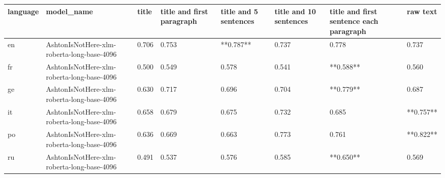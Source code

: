 \begin{tabular}{llllllll}
\toprule
language &                                 model\_name & title & title and first paragraph & title and 5 sentences & title and 10 sentences & title and first sentence each paragraph &  raw text \\
\midrule
      en & AshtonIsNotHere-xlm-roberta-long-base-4096 & 0.706 &                     0.753 &             **0.787** &                  0.737 &                                   0.778 &     0.737 \\
      fr & AshtonIsNotHere-xlm-roberta-long-base-4096 & 0.500 &                     0.549 &                 0.578 &                  0.541 &                               **0.588** &     0.560 \\
      ge & AshtonIsNotHere-xlm-roberta-long-base-4096 & 0.630 &                     0.717 &                 0.696 &                  0.704 &                               **0.779** &     0.687 \\
      it & AshtonIsNotHere-xlm-roberta-long-base-4096 & 0.658 &                     0.679 &                 0.675 &                  0.732 &                                   0.685 & **0.757** \\
      po & AshtonIsNotHere-xlm-roberta-long-base-4096 & 0.636 &                     0.669 &                 0.663 &                  0.773 &                                   0.761 & **0.822** \\
      ru & AshtonIsNotHere-xlm-roberta-long-base-4096 & 0.491 &                     0.537 &                 0.576 &                  0.585 &                               **0.650** &     0.569 \\
\bottomrule
\end{tabular}
